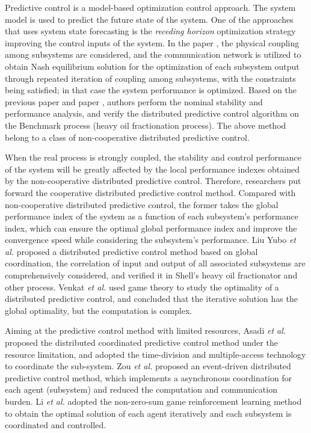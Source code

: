 \documentclass[runningheads]{llncs}
\begin{document}
Predictive control is a model-based optimization control approach. The system model is used to predict the future state of the system. One of the approaches that uses system state forecasting is the \emph{receding horizon} optimization strategy improving the control inputs of the system. In the paper \cite{dux}, the physical coupling among subsystems are considered, and the communication network is utilized to obtain Nash equilibrium solution for the optimization of each subsystem output through repeated iteration of coupling among subsystems, with the constraints being satisfied; in that case the system performance is optimized. Based on the previous paper \cite{dux} and paper \cite{lis}, authors perform the nominal stability and performance analysis, and verify the distributed predictive control algorithm on the Benchmark process (heavy oil fractionation process). The above method belong to a class of non-cooperative distributed predictive control.

When the real process is strongly coupled, the stability and control performance of the system will be greatly affected by the local performance indexes obtained by the non-cooperative distributed predictive control. Therefore, researchers put forward the cooperative distributed predictive control method. Compared with non-cooperative distributed predictive control, the former takes the global performance index of the system as a function of each subsystem's performance index, which can ensure the optimal global performance index and improve the convergence speed while considering the subsystem's performance. Liu Yubo \emph{et al.} \cite{liuy} proposed a distributed predictive control method based on global coordination, the correlation of input and output of all associated subsystems are comprehensively considered, and verified it in Shell's heavy oil fractionator and other process. Venkat \emph{et al.} \cite{venkat} used game theory to study the optimality of a distributed predictive control, and concluded that the iterative solution has the global optimality, but the computation is complex.

Aiming at the predictive control method with limited resources, Asadi \emph{et al.} \cite{asadi} proposed the distributed coordinated predictive control method under the resource limitation, and adopted the time-division and multiple-access technology to coordinate the sub-system. Zou \emph{et al.} \cite{zouyy} proposed an event-driven distributed predictive control method, which implements a asynchronous coordination for each agent (subsystem) and reduced the computation and communication burden. Li \emph{et al.} \cite{lijn} adopted the non-zero-sum game reinforcement learning method to obtain the optimal solution of each agent iteratively and each subsystem is coordinated and controlled.
\end{document}
